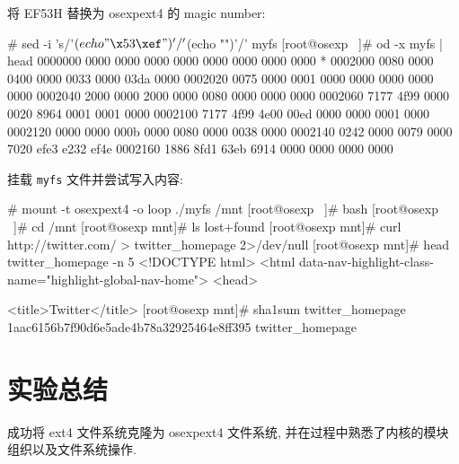 \documentclass[11pt]{report}
\begin{document}
        将 EF53H 替换为 osexpext4 的 magic number:

\begin{console}
# sed -i 's/'$(echo "\x53\xef")'/'$(echo "")'/' myfs
[root@osexp ~]# od -x myfs | head
0000000 0000 0000 0000 0000 0000 0000 0000 0000
*
0002000 0080 0000 0400 0000 0033 0000 03da 0000
0002020 0075 0000 0001 0000 0000 0000 0000 0000
0002040 2000 0000 2000 0000 0080 0000 0000 0000
0002060 7177 4f99 0000 0020 8964 0001 0001 0000
0002100 7177 4f99 4e00 00ed 0000 0000 0001 0000
0002120 0000 0000 000b 0000 0080 0000 0038 0000
0002140 0242 0000 0079 0000 7020 efe3 e232 ef4e
0002160 1886 8fd1 63eb 6914 0000 0000 0000 0000
\end{console}

        挂载 \verb|myfs| 文件并尝试写入内容:

\begin{console}
# mount -t osexpext4 -o loop ./myfs /mnt
[root@osexp ~]# bash
[root@osexp ~]# cd /mnt
[root@osexp mnt]# ls
lost+found
[root@osexp mnt]# curl http://twitter.com/ > twitter_homepage 2>/dev/null
[root@osexp mnt]# head twitter_homepage  -n 5
<!DOCTYPE html>
<html data-nav-highlight-class-name="highlight-global-nav-home">
  <head>

    <title>Twitter</title>
[root@osexp mnt]# sha1sum twitter_homepage
1aac6156b7f90d6e5ade4b78a32925464e8ff395  twitter_homepage
\end{console}

    \section{实验总结}

        成功将 ext4 文件系统克隆为 osexpext4 文件系统, 并在过程中熟悉了内核的模块组织以及文件系统操作.
\end{document}

